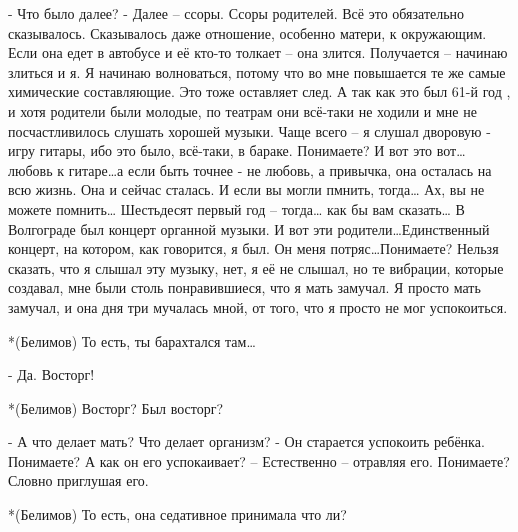 - Что было далее? - Далее – ссоры. Ссоры родителей. Всё это обязательно сказывалось. Сказывалось даже отношение, особенно матери, к окружающим. Если она едет в автобусе и её кто-то толкает – она злится. Получается – начинаю злиться и я. Я начинаю волноваться, потому что во мне повышается те же самые химические составляющие. Это тоже оставляет след. А так как это был 61-й год , и хотя родители были молодые, по театрам они всё-таки не ходили и мне не посчастливилось слушать хорошей музыки. Чаще всего – я слушал дворовую -  игру гитары, ибо это было, всё-таки, в бараке. Понимаете? И вот это вот… любовь к гитаре…а если быть точнее - не любовь, а привычка, она осталась на всю жизнь. Она и сейчас сталась. И если вы могли пмнить, тогда… Ах, вы не можете помнить… Шестьдесят первый год – тогда… как бы вам сказать… В Волгограде был концерт органной музыки. И вот эти родители…Единственный концерт, на котором, как говорится, я был.  Он меня потряс…Понимаете? Нельзя сказать, что я слышал эту музыку, нет, я её не слышал, но те вибрации, которые создавал, мне были столь понравившиеся, что я мать замучал. Я просто мать замучал, и она дня три мучалась мной, от того, что я просто не мог успокоиться.

*(Белимов) То есть, ты барахтался там…

- Да. Восторг!

*(Белимов) Восторг? Был восторг?

- А что делает мать? Что делает организм? - Он старается успокоить ребёнка. Понимаете? А как он его успокаивает? – Естественно – отравляя его. Понимаете? Словно приглушая его.


*(Белимов) То есть, она седативное принимала что ли?

